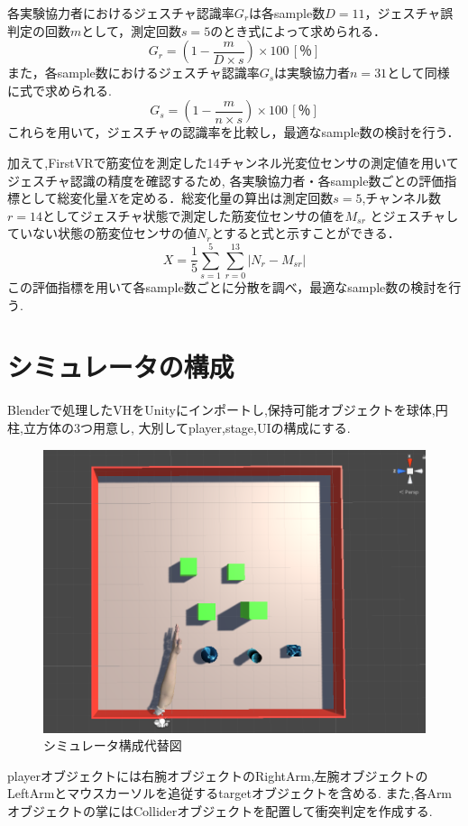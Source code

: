 \documentclass{ltjsreport}
\begin{document}
		各実験協力者におけるジェスチャ認識率$G_{r}$は各sample数$D = 11$，ジェスチャ誤判定の回数$m$として，測定回数$s = 5$のとき式によって求められる．
		\begin{equation}
			\label{eq:gestureprobability1}
			G_{r} = \left( 1-\frac{m}{D \times s} \right) \times 100 \, [％]
		\end{equation}
		また，各sample数におけるジェスチャ認識率$G_{s}$は実験協力者$n = 31$として同様に式で求められる.
		\begin{equation}
			\label{eq:gestureprobability2}
			G_{s} = \left( 1-\frac{m}{n \times s} \right) \times 100 \, [％]
		\end{equation}
		これらを用いて，ジェスチャの認識率を比較し，最適なsample数の検討を行う．
		
		加えて,FirstVRで筋変位を測定した14チャンネル光変位センサの測定値を用いてジェスチャ認識の精度を確認するため,
		各実験協力者・各sample数ごとの評価指標として総変化量$X$を定める．総変化量の算出は測定回数$s = 5$,チャンネル数$r = 14$としてジェスチャ状態で測定した筋変位センサの値を$M_{{s}{r}}$
		とジェスチャしていない状態の筋変位センサの値$N_{r}$とすると式と示すことができる．
		\begin{equation}
			\label{eq:originaldata}
			X = \frac{1}{5} \sum_{s = 1}^{5} \sum_{r = 0}^{13} |N_{r} - M_{{s}{r}}|
		\end{equation}
		この評価指標を用いて各sample数ごとに分散を調べ，最適なsample数の検討を行う.
	\section{シミュレータの構成}
		Blenderで処理したVHをUnityにインポートし,保持可能オブジェクトを球体,円柱,立方体の3つ用意し,
		大別してplayer,stage,UIの構成にする.
		\begin{figure}[H]
		\centering
		\includegraphics[width = 12cm]{../figs/fieldup.png}
		\caption{シミュレータ構成代替図}
		\label{fig:simuraterconst}
		\end{figure}
		playerオブジェクトには右腕オブジェクトのRightArm,左腕オブジェクトのLeftArmとマウスカーソルを追従するtargetオブジェクトを含める.
		また,各Armオブジェクトの掌にはColliderオブジェクトを配置して衝突判定を作成する.
\end{document}
